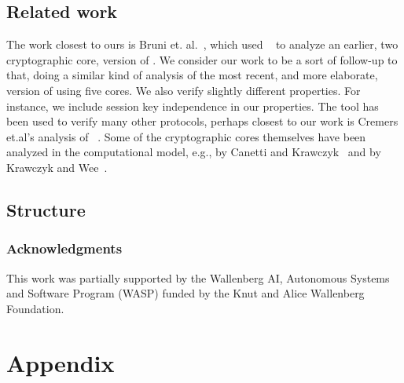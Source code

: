 \documentclass[runningheads]{llncs}
\begin{document}
\subsection{Related work}
\label{sec:relatedWork}
The work closest to ours is Bruni et. al.~\cite{DBLP:conf/secsr/BruniJPS18},
which used \mProverif~\cite{DBLP:conf/csfw/Blanchet01} to analyze an earlier,
two cryptographic core, version of \mEdhoc.
%
We consider our work to be a sort of follow-up to that, doing a similar kind of
analysis of the most recent, and more elaborate, version of \mEdhoc using five
cores.
%
We also verify slightly different properties.
%
For instance, we include session key independence in our properties.
%
The \mTamarin tool has been used to verify many other protocols, perhaps closest
to our work is Cremers et.al's analysis of
\mTls~\cite{DBLP:conf/ccs/CremersHHSM17}.
%
Some of the cryptographic cores themselves have been analyzed in the
computational model, e.g., \mSigma by Canetti and
Krawczyk~\cite{DBLP:conf/crypto/CanettiK02} and \mOptls by Krawczyk and
Wee~\cite{DBLP:conf/eurosp/KrawczykW16}.
%

\subsection{Structure}
\label{sec:structure}


\subsubsection*{Acknowledgments} This work was partially supported by
the Wallenberg AI, Autonomous Systems and Software Program (WASP) funded by
the Knut and Alice Wallenberg Foundation.
%





\appendix
\section*{Appendix}


\end{document}
